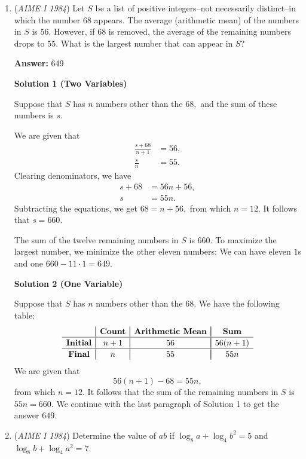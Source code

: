 \begin{enumerate}
	\item (\textit{AIME I 1984}) Let $S$ be a list of positive integers--not necessarily distinct--in which the number $68$ appears. The average (arithmetic mean) of the numbers in $S$ is $56$. However, if $68$ is removed, the average of the remaining numbers drops to $55$. What is the largest number that can appear in $S$?


 
 \textbf{Answer: }649



\textbf{Solution 1 (Two Variables)}

Suppose that $S$ has $n$ numbers other than the $68,$ and the sum of these numbers is $s.$

 We are given that 
 \begin{align*} \frac{s+68}{n+1}&=56, \\ \frac{s}{n}&=55. \end{align*}
Clearing denominators, we have
 \begin{align*} s+68&=56n+56, \\ s&=55n. \end{align*}
Subtracting the equations, we get $68=n+56,$ from which $n=12.$ It follows that $s=660.$

 The sum of the twelve remaining numbers in $S$ is $660.$ To maximize the largest number, we minimize the other eleven numbers: We can have eleven $1$s and one $660-11\cdot1=\boxed{649}.$




\textbf{Solution 2 (One Variable)}

Suppose that $S$ has $n$ numbers other than the $68.$ We have the following table:
 \[\begin{array}{c|c|c|c} & & & \\ [-2.5ex] & \textbf{Count} & \textbf{Arithmetic Mean} & \textbf{Sum} \\ \hline & & & \\ [-2.5ex] \textbf{Initial} & n+1 & 56 & 56(n+1) \\ \hline & & & \\ [-2.5ex] \textbf{Final} & n & 55 & 55n \end{array}\]We are given that 
 \[56(n+1)-68=55n,\] from which $n=12.$ It follows that the sum of the remaining numbers in $S$ is $55n=660.$ We continue with the last paragraph of Solution 1 to get the answer $\boxed{649}.$



	\item (\textit{AIME I 1984}) Determine the value of $ab$ if $\log_8a+\log_4b^2=5$ and $\log_8b+\log_4a^2=7$.



\end{enumerate}
